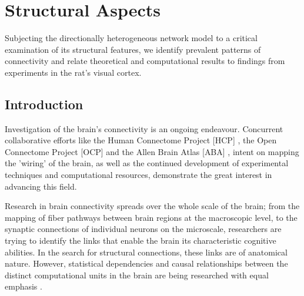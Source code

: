 \chapter{Structural Aspects}\label{ch:structural_aspects} %
Subjecting the directionally heterogeneous network model to a critical
examination of its structural features, we identify prevalent
patterns of connectivity and relate theoretical and computational
results to findings from experiments in the rat's visual cortex.

\section{Introduction}



             

Investigation 
  of the brain's connectivity is an ongoing endeavour.  Concurrent
  collaborative efforts like the Human Connectome Project
  [\textcolor{linkgrey}{HCP}]%
  , the Open Connectome Project [\textcolor{linkgrey}{OCP}]%
  and the Allen Brain Atlas [\textcolor{linkgrey}{ABA}]%
  , intent on mapping the 'wiring' of the brain, as well as the
  continued development of experimental techniques and computational
  resources, demonstrate the
  great interest in advancing this field.

Research in brain connectivity spreads over the whole scale  of the
brain; from the mapping of fiber pathways between brain regions at the
macroscopic level, to the synaptic connections of individual neurons
on the microscale, researchers are trying to identify the links that
enable the brain its characteristic cognitive abilities.
In the search for structural connections, these links are of
anatomical nature. However, statistical dependencies and causal
relationships between the distinct computational units in the brain
are being researched with equal emphasis \parencite{Scholarpedia-BrainConnectivity}.

